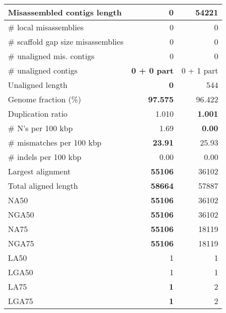 \documentclass[12pt,a4paper]{article}
\begin{document}
\begin{table}[ht]
\begin{center}
\begin{tabular}{|l*{2}{|r}|}
Misassembled contigs length & {\bf 0} & 54221 \\ \hline
\# local misassemblies & 0 & 0 \\ \hline
\# scaffold gap size misassemblies & 0 & 0 \\ \hline
\# unaligned mis. contigs & 0 & 0 \\ \hline
\# unaligned contigs & {\bf 0 + 0 part} & 0 + 1 part \\ \hline
Unaligned length & {\bf 0} & 544 \\ \hline
Genome fraction (\%) & {\bf 97.575} & 96.422 \\ \hline
Duplication ratio & 1.010 & {\bf 1.001} \\ \hline
\# N's per 100 kbp & 1.69 & {\bf 0.00} \\ \hline
\# mismatches per 100 kbp & {\bf 23.91} & 25.93 \\ \hline
\# indels per 100 kbp & 0.00 & 0.00 \\ \hline
Largest alignment & {\bf 55106} & 36102 \\ \hline
Total aligned length & {\bf 58664} & 57887 \\ \hline
NA50 & {\bf 55106} & 36102 \\ \hline
NGA50 & {\bf 55106} & 36102 \\ \hline
NA75 & {\bf 55106} & 18119 \\ \hline
NGA75 & {\bf 55106} & 18119 \\ \hline
LA50 & 1 & 1 \\ \hline
LGA50 & 1 & 1 \\ \hline
LA75 & {\bf 1} & 2 \\ \hline
LGA75 & {\bf 1} & 2 \\ \hline
\end{tabular}
\end{center}
\end{table}
\end{document}
